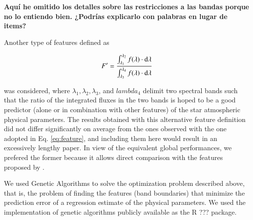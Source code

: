 {{{\bf Aquí he omitido los detalles sobre las restricciones a las bandas
porque no lo entiendo bien. ¿Podrías explicarlo con palabras en lugar
de items?}


Another type of features defined as

\begin{equation}\label{eq:feature2}
  F' = \frac{ \int_{\lambda_{1}}^{\lambda_{2}}f(\lambda) \cdot {\rm d}{\lambda}}
               {\int_{\lambda_{3}}^{\lambda_{4}} f(\lambda) \cdot {\rm d}{\lambda}} 
\end{equation}

was considered, where $\lambda_1, \lambda_2, \lambda_3$, and
$lambda_4$ delimit two spectral bands such that the ratio of the
integrated fluxes in the two bands is hoped to be a good predictor
(alone or in combination with other features) of the star atmospheric
physical parameters. The results obtained with this alternative
feature definition did not differ significantly on average from the
ones observed with the one adopted in Eq. \ref{eq:feature}, and
including them here would result in an excessively lengthy paper. In
view of the equivalent global performances, we prefered the former
because it allows direct comparison with the features proposed
by \cite{2013A&A...549A.129C}.

We used Genetic Algorithms to solve the optimization problem described
above, that is, the problem of finding the features (band boundaries)
that minimize the prediction error of a regression estimate of the
physical parameters. We used the implementation of genetic algorithms
publicly available as the R \citep{R2013} ???  package.

}}
